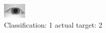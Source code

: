 \begin{figure}[h!]
\begin{center}
\includegraphics[width=0.60\columnwidth]{figures/ID863_class_1_target_2.png}
\end{center}
\caption{ Classification: 1 actual target: 2}
\label{fig:ID863_class_1_target_2}
\end{figure}
